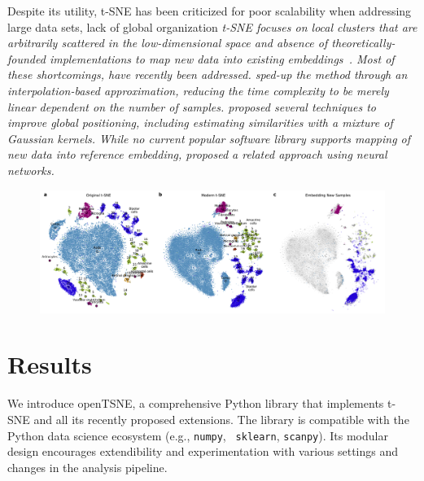 \documentclass[twocolumn]{bmcart}
\begin{document}
Despite its utility, t-SNE has been criticized for poor scalability
when addressing large data sets, lack of global organization \em t-SNE
focuses on local clusters that are arbitrarily scattered in the
low-dimensional space \em and absence of theoretically-founded implementations to
map new data into existing embeddings~\cite{ding2018interpretable,becht2019dimensionality}. Most of these shortcomings, have
recently been addressed.
\cite{fi_tsne} sped-up the method through an interpolation-based
approximation, reducing the time complexity to be merely linear dependent on the number of samples. \cite{art_of_using_tsne} proposed
several techniques to improve global positioning, including estimating similarities with a mixture of
Gaussian kernels. While no current popular
software library supports mapping of new data into reference embedding,
\cite{parametric_tsne} proposed a related approach
using neural networks.



\begin{figure}[htbp]
  \includegraphics[width=\textwidth]{macosko2015}
  \caption{\label{fig:macosko}}
\end{figure}

\section*{Results}


We introduce openTSNE, a comprehensive Python library that
implements t-SNE and all its recently proposed extensions. The library is
compatible with the Python data science ecosystem (e.g., {\tt numpy}, {\tt
sklearn}, {\tt scanpy}). Its modular design encourages extendibility and
experimentation with various settings and changes in the analysis pipeline.
\end{document}
